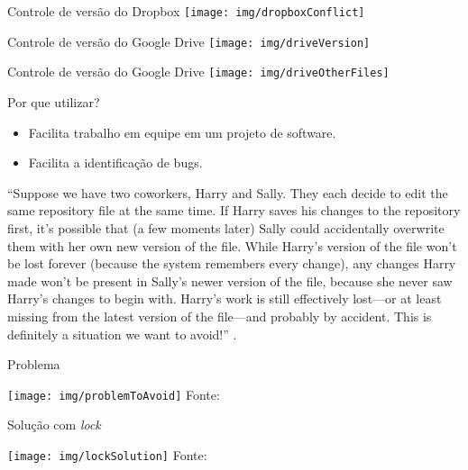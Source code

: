 \documentclass[a4paper]{beamer}
\begin{document}
\begin{frame}{Controle de versão do Dropbox}
\texttt{[image: img/dropboxConflict]}
\end{frame}

\begin{frame}{Controle de versão do Google Drive}
\texttt{[image: img/driveVersion]}
\end{frame}

\begin{frame}{Controle de versão do Google Drive}
\texttt{[image: img/driveOtherFiles]}
\end{frame}

\begin{frame}{Por que utilizar?}

\begin{itemize}
\item Facilita trabalho em equipe em um projeto de software.
\item Facilita a identificação de bugs.
\end{itemize}

\pause
\begin{block}{}
``Suppose we have two coworkers, Harry and Sally. They each decide to edit the same repository file at the same time. If Harry saves his changes to the repository first, it's possible that (a few moments later) Sally could accidentally overwrite them with her own new version of the file. While Harry's version of the file won't be lost forever (because the system remembers every change), any changes Harry made won't be present in Sally's newer version of the file, because she never saw Harry's changes to begin with. Harry's work is still effectively lost—or at least missing from the latest version of the file—and probably by accident. This is definitely a situation we want to avoid!'' \cite{svnBook}.
\end{block}

\end{frame}

\begin{frame}{Problema}
\begin{center}
\texttt{[image: img/problemToAvoid]}
\hspace{5pt}
{\scriptsize Fonte: \cite{svnBook}}
\end{center}
\end{frame}

\begin{frame}{Solução com \textit{lock}}
\begin{center}
\texttt{[image: img/lockSolution]}
\hspace{5pt}
{\scriptsize Fonte: \cite{svnBook}}
\end{center}
\end{frame}
\end{document}
